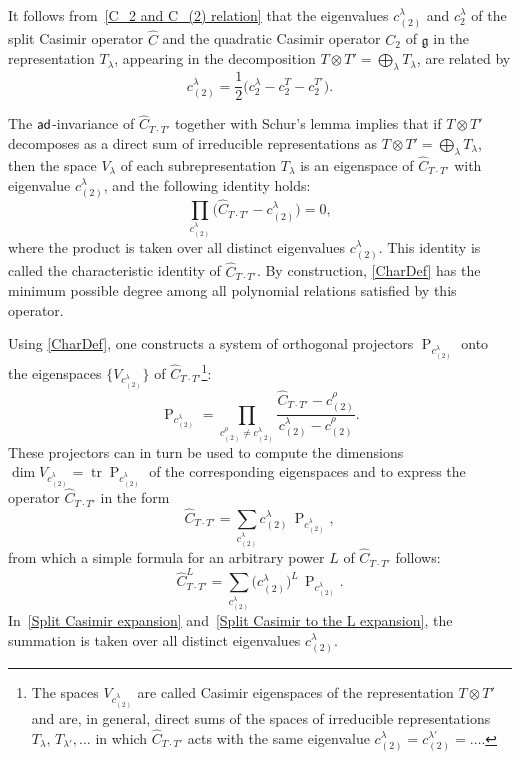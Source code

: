 \documentclass[a4paper]{article}
\newcommand{\hC}{\widehat{C}}
\newcommand{\ad}{{\sf ad}}
\renewcommand{\=}{\ =\ }
\DeclareMathOperator{\proj}{P}
\DeclareMathOperator{\tr}{tr}
\newcommand{\mfg}{\mathfrak{g}}
\numberwithin{equation}{section}
\theoremstyle{remark}
\begin{document}
It follows from~\eqref{C_2 and C_(2) relation} that the eigenvalues
$c_{(2)}^{\lambda}$ and $c_{2}^{\lambda}$ of the split Casimir operator
$\hC$ and the quadratic Casimir operator $C_2$ of $\mfg$ in the representation
$T_\lambda$, appearing in the decomposition
$T\otimes T'=\bigoplus_{\lambda}T_\lambda$, are related by
\begin{equation}\label{Split via quadratic}
c_{(2)}^{\lambda}=\frac{1}{2}\bigl(c_{2}^{\lambda}-c_2^T-c_2^{T'}\bigr).
\end{equation}

The $\ad$-invariance of $\hC_{T\cdot T'}$ together with Schur's lemma implies that if
$T\otimes T'$ decomposes as a direct sum of irreducible representations as $T\otimes T'=\bigoplus_{\lambda}T_\lambda$, then the space $V_{\lambda}$ of each subrepresentation $T_\lambda$ is an eigenspace of $\hC_{T\cdot T'}$ with eigenvalue $c_{(2)}^{\lambda}$, and the following identity holds:
\begin{equation}\label{CharDef}
\prod_{c_{(2)}^{\lambda}}\bigl(\hC_{T\cdot T'}-c_{(2)}^{\lambda}\bigr)=0,
\end{equation}
where the product is taken over all distinct eigenvalues $c_{(2)}^{\lambda}$.
This identity is called the characteristic identity of $\hC_{T\cdot T'}$.
By construction, \eqref{CharDef} has the minimum possible degree among all polynomial relations satisfied by this operator.

Using \eqref{CharDef}, one constructs a system of orthogonal projectors
$\proj_{c_{(2)}^{\lambda}}$ onto the eigenspaces $\{V_{c_{(2)}^{\lambda}}\}$ of $\hC_{T\cdot T'}$\footnote{The spaces $V_{c_{(2)}^{\lambda}}$ are called Casimir eigenspaces of the representation $T\otimes T'$ and are, in general, direct sums of the spaces of irreducible representations $T_\lambda,\,T_{\lambda'},\dots$ in which $\hC_{T\cdot T'}$ acts with the same eigenvalue $c_{(2)}^{\lambda}=c_{(2)}^{\lambda'}=\dots$.}:
\begin{equation}\label{GenPr}
\proj_{c_{(2)}^{\lambda}}=
\prod_{c_{(2)}^{\rho}\neq c_{(2)}^{\lambda}}
\frac{\hC_{T\cdot T'}-c_{(2)}^{\rho}}
{c_{(2)}^{\lambda}-c_{(2)}^{\rho}}.
\end{equation}
These projectors can in turn be used to compute the dimensions $\dim V_{c_{(2)}^\lambda}=\tr\proj_{c_{(2)}^\lambda}$ of the corresponding eigenspaces and to express the operator $\hC_{T\cdot T'}$ in the form
\begin{equation}\label{Split Casimir expansion}
\hC_{T\cdot T'}=
\sum_{c_{(2)}^{\lambda}}
c_{(2)}^{\lambda}\,\proj_{c_{(2)}^{\lambda}},
\end{equation}
from which a simple formula for an arbitrary power $L$ of $\hC_{T\cdot T'}$ follows:
\begin{equation}\label{Split Casimir to the L expansion}
\hC_{T\cdot T'}^L=
\sum_{c_{(2)}^{\lambda}}
\bigl(c_{(2)}^{\lambda}\bigr)^L\,
\proj_{c_{(2)}^{\lambda}}.
\end{equation}
In~\eqref{Split Casimir expansion} and~\eqref{Split Casimir to the L expansion}, the summation is taken over all distinct eigenvalues $c_{(2)}^{\lambda}$.
\end{document}
